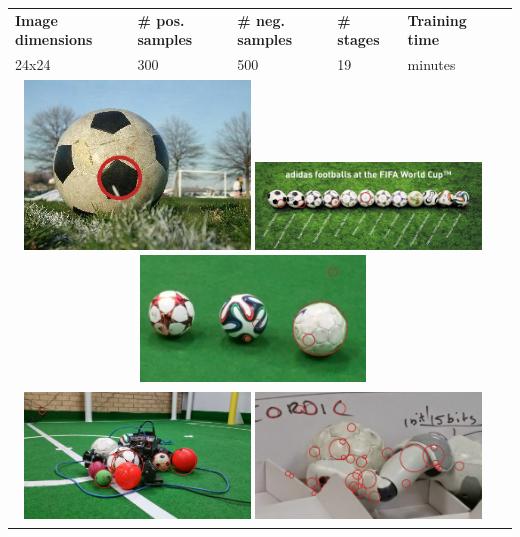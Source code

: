 \begin{tabularx}
{\textwidth}{llllll}
    \textbf{Image dimensions} & \textbf{\# pos. samples} & \textbf{\# neg. samples} & \textbf{\# stages} & \textbf{Training time} \\
    24x24 & 300 & 500 & 19 & \mytilda7 minutes \\
    \multicolumn{5}{c}{
        \includegraphics[width=6.0cm]{results/1/sphere_3}
        \includegraphics[width=6.0cm]{results/1/sphere_4}
        \includegraphics[width=6.0cm]{results/1/sphere_5}
    } \\
    \multicolumn{5}{c}{
        \includegraphics[width=6.0cm]{results/1/sphere_6}
        \includegraphics[width=6.0cm]{results/1/sphere_7}
}
\end{tabularx}

